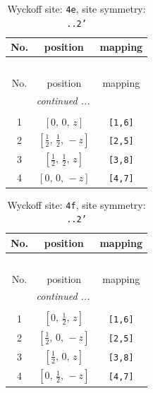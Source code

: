 \documentclass[fleqn,8pt]{jsarticle}
\begin{document}
\begin{longtable}{ccc}
\caption{Wyckoff site: {\tt 4e}, site symmetry: {\tt ..2'}}
 \\
 \hline \hline
No. & position & mapping \\ \hline \endfirsthead

\multicolumn{2}{l}{\tablename\ \thetable{}} \\
 \hline \hline
No. & position & mapping \\ \hline \endhead

 \hline \hline
\multicolumn{2}{r}{\footnotesize\it continued ...} \\ \endfoot

 \hline \hline
\multicolumn{2}{r}{} \\ \endlastfoot

1 & $\left[ 0,\, 0,\, z \right]$ & {\tt [1,6]} \\ \hline
2 & $\left[ \frac{1}{2},\, \frac{1}{2},\, - z \right]$ & {\tt [2,5]} \\ \hline
3 & $\left[ \frac{1}{2},\, \frac{1}{2},\, z \right]$ & {\tt [3,8]} \\ \hline
4 & $\left[ 0,\, 0,\, - z \right]$ & {\tt [4,7]} \\
\end{longtable}
\renewcommand{\arraystretch}{1.2}
\begin{longtable}{ccc}
\caption{Wyckoff site: {\tt 4f}, site symmetry: {\tt ..2'}}
 \\
 \hline \hline
No. & position & mapping \\ \hline \endfirsthead

\multicolumn{2}{l}{\tablename\ \thetable{}} \\
 \hline \hline
No. & position & mapping \\ \hline \endhead

 \hline \hline
\multicolumn{2}{r}{\footnotesize\it continued ...} \\ \endfoot

 \hline \hline
\multicolumn{2}{r}{} \\ \endlastfoot

1 & $\left[ 0,\, \frac{1}{2},\, z \right]$ & {\tt [1,6]} \\ \hline
2 & $\left[ \frac{1}{2},\, 0,\, - z \right]$ & {\tt [2,5]} \\ \hline
3 & $\left[ \frac{1}{2},\, 0,\, z \right]$ & {\tt [3,8]} \\ \hline
4 & $\left[ 0,\, \frac{1}{2},\, - z \right]$ & {\tt [4,7]} \\
\end{longtable}
\end{document}
